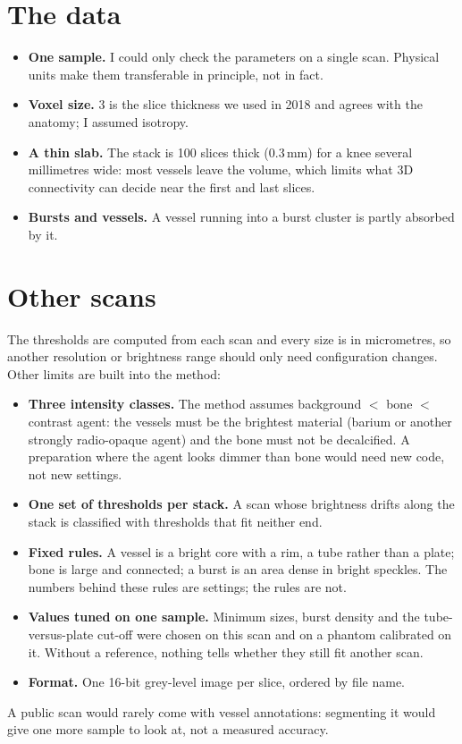 \section{The data}

\begin{itemize}
  \item \textbf{One sample.} I could only check the parameters on a single scan. Physical units make them
        transferable in principle, not in fact.
  \item \textbf{Voxel size.} 3\um{} is the slice thickness we used in 2018 and agrees with the
        anatomy; I assumed isotropy.
  \item \textbf{A thin slab.} The stack is 100 slices thick (0.3\,mm) for a knee several millimetres
        wide: most vessels leave the volume, which limits what 3D connectivity can decide near the
        first and last slices.
  \item \textbf{Bursts and vessels.} A vessel running into a burst cluster is partly absorbed by it.
\end{itemize}

\section{Other scans}

The thresholds are computed from each scan and every size is in micrometres, so another resolution or
brightness range should only need configuration changes. Other limits are built into the method:
\begin{itemize}
  \item \textbf{Three intensity classes.} The method assumes background $<$ bone $<$ contrast agent:
        the vessels must be the brightest material (barium or another strongly radio-opaque agent) and
        the bone must not be decalcified. A preparation where the agent looks dimmer than bone would
        need new code, not new settings.
  \item \textbf{One set of thresholds per stack.} A scan whose brightness drifts along the stack is
        classified with thresholds that fit neither end.
  \item \textbf{Fixed rules.} A vessel is a bright core with a rim, a tube rather than a plate; bone is
        large and connected; a burst is an area dense in bright speckles. The numbers behind these rules
        are settings; the rules are not.
  \item \textbf{Values tuned on one sample.} Minimum sizes, burst density and the tube-versus-plate
        cut-off were chosen on this scan and on a phantom calibrated on it. Without a reference, nothing
        tells whether they still fit another scan.
  \item \textbf{Format.} One 16-bit grey-level image per slice, ordered by file name.
\end{itemize}
A public scan would rarely come with vessel annotations: segmenting it would give one more sample to
look at, not a measured accuracy.

